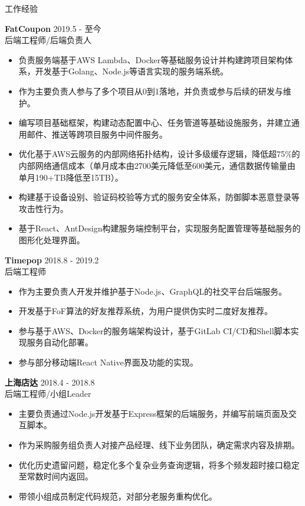 \documentclass{resume} %
\begin{document}
\begin{rSection}{工作经验}

\textbf{FatCoupon} \hfill 2019.5 - 至今\\
后端工程师/后端负责人 \hfill \textit{}
\begin{itemize}
  \itemsep -3pt {}
  \item 负责服务端基于AWS Lambda、Docker等基础服务设计并构建跨项目架构体系，开发基于Golang、Node.js等语言实现的服务端系统。
  \item 作为主要负责人参与了多个项目从0到1落地，并负责或参与后续的研发与维护。
  \item 编写项目基础框架，构建动态配置中心、任务管道等基础设施服务，并建立通用邮件、推送等跨项目服务中间件服务。
  \item 优化基于AWS云服务的内部网络拓扑结构，设计多级缓存逻辑，降低超75\%的内部网络通信成本（单月成本由2700美元降低至600美元，通信数据传输量由单月190+TB降低至15TB）。
  \item 构建基于设备设别、验证码校验等方式的服务安全体系，防御脚本恶意登录等攻击性行为。
  \item 基于React、AntDesign构建服务端控制平台，实现服务配置管理等基础服务的图形化处理界面。
\end{itemize}

\textbf{Timepop} \hfill 2018.8 - 2019.2\\
后端工程师 \hfill \textit{}
\begin{itemize}
  \itemsep -3pt {}
  \item 作为主要负责人开发并维护基于Node.js、GraphQL的社交平台后端服务。
  \item 开发基于FoF算法的好友推荐系统，为用户提供伪实时二度好友推荐。
  \item 参与基于AWS、Docker的服务端架构设计，基于GitLab CI/CD和Shell脚本实现服务自动化部署。
  \item 参与部分移动端React Native界面及功能的实现。
\end{itemize}

\textbf{上海店达} \hfill 2018.4 - 2018.8\\
后端工程师/小组Leader \hfill \textit{}
\begin{itemize}
  \itemsep -3pt {}
  \item 主要负责通过Node.js开发基于Express框架的后端服务，并编写前端页面及交互脚本。
  \item 作为采购服务组负责人对接产品经理、线下业务团队，确定需求内容及排期。
  \item 优化历史遗留问题，稳定化多个复杂业务查询逻辑，将多个频发超时接口稳定至常数时间内返回。
  \item 带领小组成员制定代码规范，对部分老服务重构优化。
\end{itemize}


\end{rSection}
\end{document}
